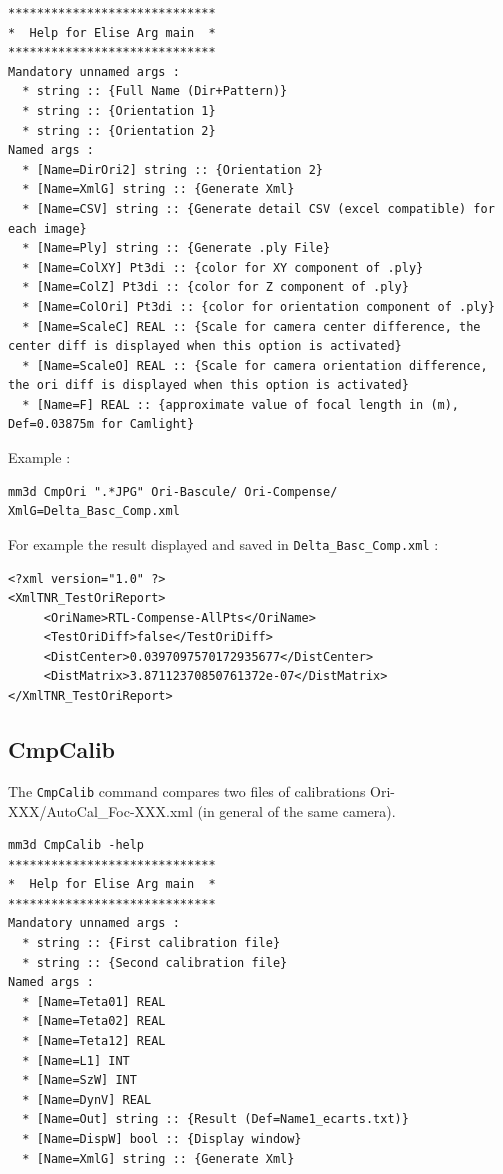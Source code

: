 \begin{verbatim}
*****************************
*  Help for Elise Arg main  *
*****************************
Mandatory unnamed args : 
  * string :: {Full Name (Dir+Pattern)}
  * string :: {Orientation 1}
  * string :: {Orientation 2}
Named args : 
  * [Name=DirOri2] string :: {Orientation 2}
  * [Name=XmlG] string :: {Generate Xml}
  * [Name=CSV] string :: {Generate detail CSV (excel compatible) for each image}
  * [Name=Ply] string :: {Generate .ply File}
  * [Name=ColXY] Pt3di :: {color for XY component of .ply}
  * [Name=ColZ] Pt3di :: {color for Z component of .ply}
  * [Name=ColOri] Pt3di :: {color for orientation component of .ply}
  * [Name=ScaleC] REAL :: {Scale for camera center difference, the center diff is displayed when this option is activated}
  * [Name=ScaleO] REAL :: {Scale for camera orientation difference, the ori diff is displayed when this option is activated}
  * [Name=F] REAL :: {approximate value of focal length in (m), Def=0.03875m for Camlight}

\end{verbatim}

Example :
\begin{verbatim}
mm3d CmpOri ".*JPG" Ori-Bascule/ Ori-Compense/ XmlG=Delta_Basc_Comp.xml
\end{verbatim}

For example the result displayed and saved in {\tt Delta\_Basc\_Comp.xml} :
\begin{verbatim}
<?xml version="1.0" ?>
<XmlTNR_TestOriReport>
     <OriName>RTL-Compense-AllPts</OriName>
     <TestOriDiff>false</TestOriDiff>
     <DistCenter>0.0397097570172935677</DistCenter>
     <DistMatrix>3.87112370850761372e-07</DistMatrix>
</XmlTNR_TestOriReport>
\end{verbatim}


\subsection{CmpCalib}
The {\tt CmpCalib} command compares two files of calibrations Ori-XXX/AutoCal\_Foc-XXX.xml (in general of the same camera).

\begin{verbatim}
mm3d CmpCalib -help
*****************************
*  Help for Elise Arg main  *
*****************************
Mandatory unnamed args : 
  * string :: {First calibration file}
  * string :: {Second calibration file}
Named args : 
  * [Name=Teta01] REAL
  * [Name=Teta02] REAL
  * [Name=Teta12] REAL
  * [Name=L1] INT
  * [Name=SzW] INT
  * [Name=DynV] REAL
  * [Name=Out] string :: {Result (Def=Name1_ecarts.txt)}
  * [Name=DispW] bool :: {Display window}
  * [Name=XmlG] string :: {Generate Xml}
\end{verbatim}

